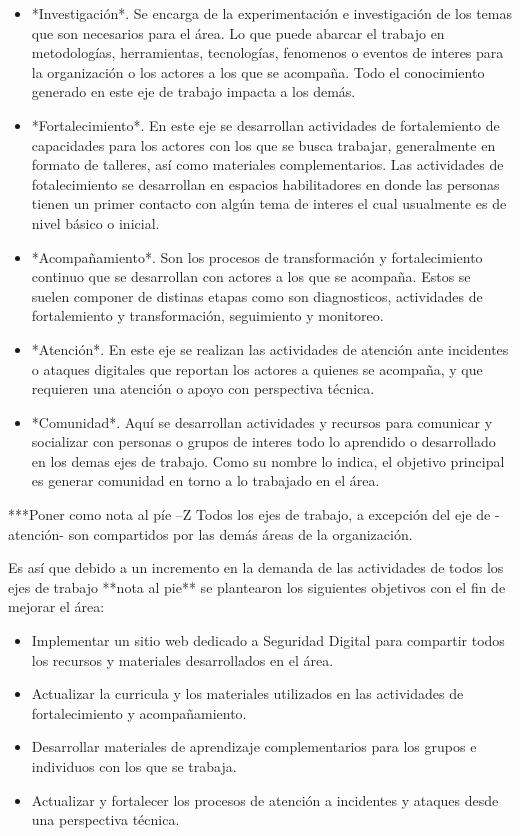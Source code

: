 \documentclass[12pt]{caltech_thesis}
\begin{document}
\begin{itemize}
    \item *Investigación*. Se encarga de la experimentación e investigación de los temas que son necesarios para el área. Lo que puede abarcar el trabajo en metodologías, herramientas, tecnologías, fenomenos o eventos de interes para la organización o los actores a los que se acompaña. Todo el conocimiento generado en este eje de trabajo impacta a los demás.
    \item *Fortalecimiento*. En este eje se desarrollan actividades de fortalemiento de capacidades para los actores con los que se busca trabajar, generalmente en formato de talleres, así como materiales complementarios. Las actividades de fotalecimiento se desarrollan en espacios habilitadores en donde las personas tienen un primer contacto con algún tema de interes el cual usualmente es de nivel básico o inicial.
    \item *Acompañamiento*. Son los procesos de transformación y fortalecimiento continuo que se desarrollan con actores a los que se acompaña. Estos se suelen componer de distinas etapas como son diagnosticos, actividades de fortalemiento y transformación, seguimiento y monitoreo. 
    \item *Atención*. En este eje se realizan las actividades de atención ante incidentes o ataques digitales que reportan los actores a quienes se acompaña, y que requieren una atención o apoyo con perspectiva técnica.
    \item *Comunidad*. Aquí se desarrollan actividades y recursos para comunicar y socializar con personas o grupos de interes todo lo aprendido o desarrollado en los demas ejes de trabajo. Como su nombre lo indica, el objetivo principal es generar comunidad en torno a lo trabajado en el área. 
\end{itemize}

***Poner como nota al píe --Z Todos los ejes de trabajo, a excepción del eje de -atención- son compartidos por las demás áreas de la organización.

Es así que debido a un incremento en la demanda de las actividades de todos los ejes de trabajo **nota al pie** se plantearon los siguientes objetivos con el fin de mejorar el área:

\begin{itemize}
    \item Implementar un sitio web dedicado a Seguridad Digital para compartir todos los recursos y materiales desarrollados en el área.
    \item Actualizar la curricula y los materiales utilizados en las actividades de fortalecimiento y acompañamiento.
    \item Desarrollar materiales de aprendizaje complementarios para los grupos e individuos con los que se trabaja. 
    \item Actualizar y fortalecer los procesos de atención a incidentes y ataques desde una perspectiva técnica.
\end{itemize}
\end{document}
